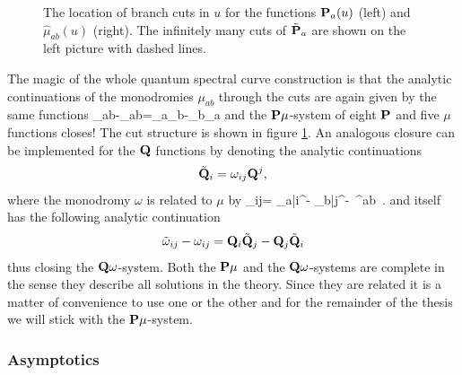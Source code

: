 \begin{figure}[t]
\caption{The location of branch cuts in $u$ for the functions ${\bf P}_a(u)$ (left) and $\hat{\mu}_{ab}(u)$ (right). The infinitely many cuts of $\tilde{{\bf P}}_a$ are shown on the left picture with dashed lines.}
\label{fig:pmu_cuts}
\end{figure}
The magic of the whole quantum spectral curve construction is that the analytic continuations of the monodromies $\mu_{ab}$ through the cuts are again given by the same functions \cite{Gromov:2014caa}
\beq
	\label{muPPt-eq}
	\tilde\mu_{ab}-\mu_{ab}=\bP_a\tilde \bP_b-\bP_b\tilde \bP_a\;
\eeq
and the ${\bf P}\mu$-system of eight ${\bf P}$ and five $\mu$ functions closes!
The cut structure is shown in figure \ref{fig:pmu_cuts}.
An analogous closure can be implemented for the ${\bf Q}$ functions by denoting the analytic continuations
\begin{equation}
\label{omegaQ}
\tilde {{\bf Q}}_i=\omega_{ij} {\bf Q}^j,
\end{equation}
where the monodromy $\omega$ is related to $\mu$ by
\beq
\label{muomega}
\omega_{ij}= _{a|i}^- _{b|j}^-\, \mu^{ab} \,.
\eeq
and itself has the following analytic continuation 
\begin{equation}\label{tQ=omegaQ}
\tilde\omega_{ij}-\omega_{ij}={\bf Q}_i\tilde{{\bf Q}}_j-{\bf Q}_j\tilde{{\bf Q}}_i
\end{equation}
thus closing the ${\bf Q}\omega$-system.
Both the ${\bf P}\mu$ and the ${\bf Q}\omega$-systems are complete in the sense they describe all solutions in the theory. 
Since they are related it is a matter of convenience to use one or the other and for the remainder of the thesis we will stick with the ${\bf P}\mu$-system.

\subsubsection{Asymptotics}

